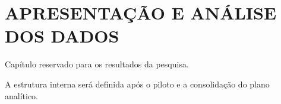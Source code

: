 \chapter{APRESENTAÇÃO E ANÁLISE DOS DADOS}

Capítulo reservado para os resultados da pesquisa.

A estrutura interna será definida após o piloto e a consolidação do plano analítico.

